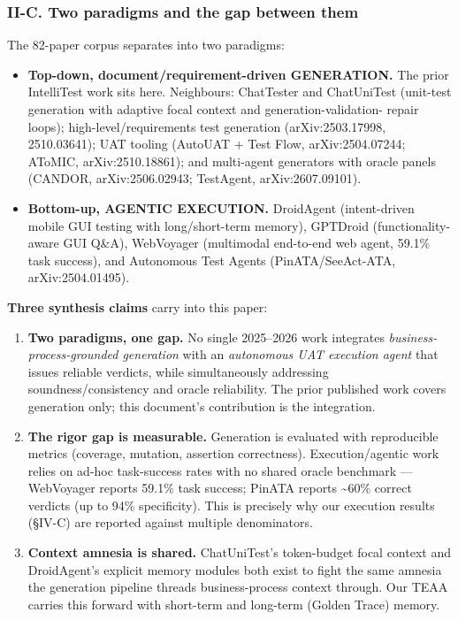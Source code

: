 \documentclass[
]{article}
\providecommand{\tightlist}{%
  \setlength{\itemsep}{0pt}\setlength{\parskip}{0pt}}
\begin{document}
\subsubsection{II-C. Two paradigms and the gap between
them}\label{ii-c.-two-paradigms-and-the-gap-between-them}

The 82-paper corpus separates into two paradigms:

\begin{itemize}
\tightlist
\item
  \textbf{Top-down, document/requirement-driven GENERATION.} The prior
  IntelliTest work sits here. Neighbours: ChatTester and ChatUniTest
  (unit-test generation with adaptive focal context and
  generation-validation- repair loops); high-level/requirements test
  generation (arXiv:2503.17998, 2510.03641); UAT tooling (AutoUAT + Test
  Flow, arXiv:2504.07244; AToMIC, arXiv:2510.18861); and multi-agent
  generators with oracle panels (CANDOR, arXiv:2506.02943; TestAgent,
  arXiv:2607.09101).
\item
  \textbf{Bottom-up, AGENTIC EXECUTION.} DroidAgent (intent-driven
  mobile GUI testing with long/short-term memory), GPTDroid
  (functionality-aware GUI Q\&A), WebVoyager (multimodal end-to-end web
  agent, 59.1\% task success), and Autonomous Test Agents
  (PinATA/SeeAct-ATA, arXiv:2504.01495).
\end{itemize}

\textbf{Three synthesis claims} carry into this paper:

\begin{enumerate}
\def\labelenumi{\arabic{enumi}.}
\tightlist
\item
  \textbf{Two paradigms, one gap.} No single 2025--2026 work integrates
  \emph{business-process-grounded generation} with an \emph{autonomous
  UAT execution agent} that issues reliable verdicts, while
  simultaneously addressing soundness/consistency and oracle
  reliability. The prior published work covers generation only; this
  document's contribution is the integration.
\item
  \textbf{The rigor gap is measurable.} Generation is evaluated with
  reproducible metrics (coverage, mutation, assertion correctness).
  Execution/agentic work relies on ad-hoc task-success rates with no
  shared oracle benchmark --- WebVoyager reports 59.1\% task success;
  PinATA reports \textasciitilde60\% correct verdicts (up to 94\%
  specificity). This is precisely why our execution results (§IV-C) are
  reported against multiple denominators.
\item
  \textbf{Context amnesia is shared.} ChatUniTest's token-budget focal
  context and DroidAgent's explicit memory modules both exist to fight
  the same amnesia the generation pipeline threads business-process
  context through. Our TEAA carries this forward with short-term and
  long-term (Golden Trace) memory.
\end{enumerate}
\end{document}
